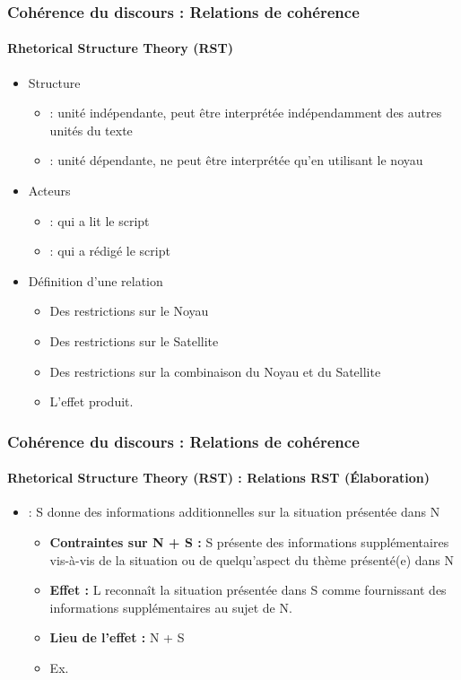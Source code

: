 \documentclass[xcolor=table]{beamer}
\begin{document}
\begin{frame}
\frametitle{Cohérence du discours : Relations de cohérence}
\framesubtitle{Rhetorical Structure Theory (RST)}
	
	\begin{itemize}
		\item Structure  
		\begin{itemize}
			\item {} :  unité indépendante, peut être interprétée indépendamment des autres unités du texte
			\item {} :  unité dépendante, ne peut être interprétée qu'en utilisant le noyau
		\end{itemize}
		\item Acteurs
		\begin{itemize}
			\item {} :  qui a lit le script
			\item {} :  qui a rédigé le script
		\end{itemize}
		\item Définition d'une relation
		\begin{itemize}
			\item Des restrictions sur le Noyau 
			\item Des restrictions sur le Satellite 
			\item Des restrictions sur la combinaison du Noyau et du Satellite 
			\item L'effet produit.
		\end{itemize}
	\end{itemize}
	
\end{frame}

\begin{frame}
	\frametitle{Cohérence du discours : Relations de cohérence}
	\framesubtitle{Rhetorical Structure Theory (RST) : Relations RST (Élaboration)}
	
	\begin{itemize}
		\item {} :  S donne des informations additionnelles sur la situation présentée dans N
		\begin{itemize}
			\item \textbf{Contraintes sur N + S :} S présente des informations supplémentaires vis-à-vis de la situation ou de quelqu'aspect du thème présenté(e) dans N 
			\item \textbf{Effet :}  L reconnaît la situation présentée dans S comme fournissant des informations supplémentaires au sujet de N. 
			\item \textbf{Lieu de l'effet :} N + S
			\item Ex. 
		\end{itemize}
	\end{itemize}
	
\end{frame}
\end{document}
